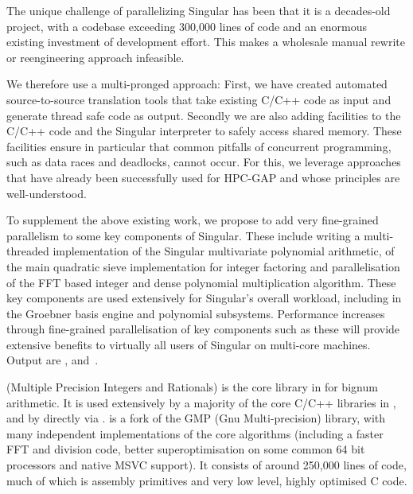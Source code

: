 \begin{workpackage}
\begin{tasklist}
\begin{task}[title=Singular,lead=UK, PM=47, id=hpc-singular,wphases=0-48!0.9]
  The unique challenge of parallelizing Singular has been that it is a decades-old
  project, with a codebase exceeding 300,000 lines of code and an enormous existing
  investment of development effort. This makes a wholesale manual rewrite or reengineering
  approach infeasible.

  We therefore use a multi-pronged approach: First, we have created automated
  source-to-source translation tools that take existing C/C++ code as input and generate
  thread safe code as output. Secondly we are also adding facilities to the C/C++ code and
  the Singular interpreter to safely access shared memory. These facilities ensure in
  particular that common pitfalls of concurrent programming, such as data races and
  deadlocks, cannot occur. For this, we leverage approaches that have already been
  successfully used for HPC-GAP and whose principles are well-understood.

  To supplement the above existing work, we propose to add very fine-grained parallelism
  to some key components of Singular. These include writing a multi-threaded
  implementation of the Singular multivariate polynomial arithmetic, of the main quadratic
  sieve implementation for integer factoring and parallelisation of the FFT based integer
  and dense polynomial multiplication algorithm. These key components are used extensively
  for Singular's overall workload, including in the Groebner basis engine and polynomial
  subsystems. Performance increases through fine-grained parallelisation of key components
  such as these will provide extensive benefits to virtually all users of Singular on
  multi-core machines.
  Output are ,  and~.
\end{task}

\begin{task}[title=\MPIR,id=hpc-mpir, lead=UK,PM=13,wphases=6-18]
\MPIR (Multiple Precision Integers and Rationals) is the core library in \Sage
for bignum arithmetic. It is used extensively by a majority of the core C/C++
libraries in \Sage, and by \Sage directly via \Cython. \MPIR is a fork of the 
GMP (Gnu Multi-precision) library, with many independent implementations of the
core algorithms (including a faster FFT and division code, better 
superoptimisation on some common 64 bit processors and native MSVC support). 
It consists of around 250,000 lines of code, much of which is assembly 
primitives and very low level, highly optimised C code.


\end{task}
\end{tasklist}
\end{workpackage}

